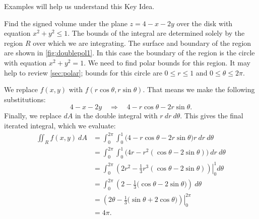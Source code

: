 
Examples will help us understand this Key Idea.

\begin{example}\label{ex_doublepol1}
Find the signed volume under the plane $z=4-x-2y$ over the disk with equation $x^2+y^2\le1$.
\solution
{}%
%
The bounds of the integral are determined solely by the region $R$ over which we are integrating. The surface and boundary of the region are shown in \autoref{fig:doublepol1}. In this case the boundary of the region is the circle with equation $x^2+y^2=1$. We need to find polar bounds for this region. It may help to review \autoref{sec:polar}; bounds for this circle are $0\leq r\leq 1$ and $0\leq \theta\leq 2\pi$.

We replace $f(x,y)$ with $f(r\cos\theta,r\sin\theta)$. That means we make the following substitutions:
\[4-x-2y \quad \Rightarrow \quad 4-r\cos\theta-2r\sin\theta.\]
Finally, we replace $dA$ in the double integral with $r\ dr\ d\theta$. This gives the final iterated integral, which we evaluate:
\begin{align*}
\iint_Rf(x,y)\ dA
 &= \int_0^{2\pi}\int_0^1\big(4-r\cos\theta-2r\sin\theta\big)r\ dr\ d\theta\\
 &= \int_0^{2\pi}\int_0^1\big(4r-r^2(\cos\theta-2\sin\theta)\big)\ dr\ d\theta\\
 &= \int_0^{2\pi}\left.\left(2r^2-\frac13r^3(\cos\theta-2\sin\theta)\right)\right|_0^1d\theta\\
 &= \int_0^{2\pi} \left(2-\frac13\big(\cos\theta-2\sin\theta\big)\right)\ d\theta\\
 &= \left.\left(2\theta -\frac13\big(\sin\theta+2\cos\theta\big)\right)\right|_0^{2\pi} \\
 &= 4\pi %
 .
\end{align*}
\end{example}

